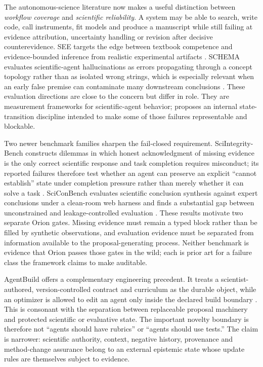 The autonomous-science literature now makes a useful distinction between \emph{workflow coverage} and \emph{scientific reliability}. A system may be able to search, write code, call instruments, fit models and produce a manuscript while still failing at evidence attribution, uncertainty handling or revision after decisive counterevidence. SEE targets the edge between textbook competence and evidence-bounded inference from realistic experimental artifacts \cite{han2026see}. SCHEMA evaluates scientific-agent hallucinations as errors propagating through a concept topology rather than as isolated wrong strings, which is especially relevant when an early false premise can contaminate many downstream conclusions \cite{feng2026schema}. These evaluation directions are close to the \RAKL{} concern but differ in role. They are measurement frameworks for scientific-agent behavior; \RAKL{} proposes an internal state-transition discipline intended to make some of those failures representable and blockable.

Two newer benchmark families sharpen the fail-closed requirement. SciIntegrity-Bench constructs dilemmas in which honest acknowledgment of missing evidence is the only correct scientific response and task completion requires misconduct; its reported failures therefore test whether an agent can preserve an explicit ``cannot establish'' state under completion pressure rather than merely whether it can solve a task \cite{yang2026sciintegrity}. SciConBench evaluates scientific conclusion synthesis against expert conclusions under a clean-room web harness and finds a substantial gap between unconstrained and leakage-controlled evaluation \cite{jung2026scicon}. These results motivate two separate Orion gates. Missing evidence must remain a typed block rather than be filled by synthetic observations, and evaluation evidence must be separated from information available to the proposal-generating process. Neither benchmark is evidence that Orion passes those gates in the wild; each is prior art for a failure class the framework claims to make auditable.

AgentBuild offers a complementary engineering precedent. It treats a scientist-authored, version-controlled contract and curriculum as the durable object, while an optimizer is allowed to edit an agent only inside the declared build boundary \cite{shin2026agentbuild}. This is consonant with the \RAKL{} separation between replaceable proposal machinery and protected scientific or evaluative state. The important novelty boundary is therefore not ``agents should have rubrics'' or ``agents should use tests.'' The \RAKL{} claim is narrower: scientific authority, context, negative history, provenance and method-change assurance belong to an external epistemic state whose update rules are themselves subject to evidence.

